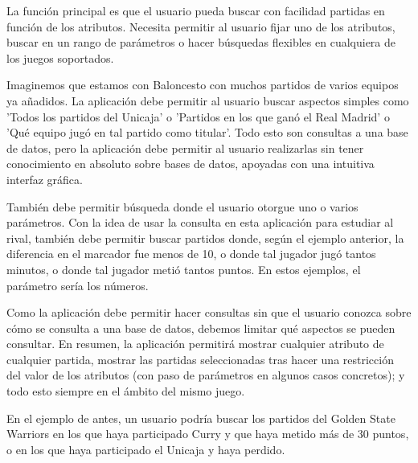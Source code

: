 La función principal es que el usuario pueda buscar con facilidad partidas en función de los atributos. Necesita permitir al usuario fijar uno de los atributos, buscar en un rango de parámetros o hacer búsquedas flexibles en cualquiera de los juegos soportados.

Imaginemos que estamos con Baloncesto con muchos partidos de varios equipos ya añadidos. La aplicación debe permitir al usuario buscar aspectos simples como 'Todos los partidos del Unicaja' o 'Partidos en los que ganó el Real Madrid' o 'Qué equipo jugó en tal partido como titular'. Todo esto son consultas a una base de datos, pero la aplicación debe permitir al usuario realizarlas sin tener conocimiento en absoluto sobre bases de datos, apoyadas con una intuitiva interfaz gráfica. 

También debe permitir búsqueda donde el usuario otorgue uno o varios parámetros. Con la idea de usar la consulta en esta aplicación para estudiar al rival, también debe permitir buscar partidos donde, según el ejemplo anterior, la diferencia en el marcador fue menos de 10, o donde tal jugador jugó tantos minutos, o donde tal jugador metió tantos puntos. En estos ejemplos, el parámetro sería los números.

Como la aplicación debe permitir hacer consultas sin que el usuario conozca sobre cómo se consulta a una base de datos, debemos limitar qué aspectos se pueden consultar. En resumen, la aplicación permitirá mostrar cualquier atributo de cualquier partida, mostrar las partidas seleccionadas tras hacer una restricción del valor de los atributos (con paso de parámetros en algunos casos concretos); y todo esto siempre en el ámbito del mismo juego.


  En el ejemplo de antes, un usuario podría buscar los partidos del Golden State Warriors en los que haya participado Curry y que haya metido más de 30 puntos, o en los que haya participado el Unicaja y haya perdido.
